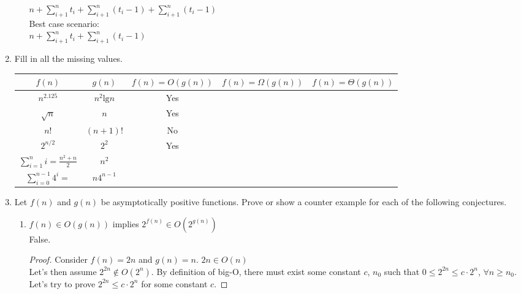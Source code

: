 \documentclass{article}
\begin{document}
\begin{enumerate}
\begin{enumerate}
                    $n + \sum_{i+1}^{n}t_i + \sum_{i+1}^{n}(t_i-1) + \sum_{i+1}^{n}(t_i-1)$\\
                    Best case scenario:\\
                    $n + \sum_{i+1}^{n}t_i + \sum_{i+1}^{n}(t_i-1)$
                \end{enumerate}
            \item Fill in all the missing values.
                \begin{center}
                    \begin{tabular}{|c | c | c | c | c|}
                        \hline
                        $f(n)$ & $g(n)$ & $f(n)=O(g(n))$ & $f(n)=\Omega(g(n))$ & $f(n)=\Theta(g(n))$\\
                        \hline
                        \hline
                        $n^{2.125}$ & $n^2\text{lg}n$ & Yes\\
                        \hline
                        $\sqrt{n}$ & $n$ & Yes\\
                        \hline
                        $n!$ & $(n+1)!$ & No\\
                        \hline
                        $2^{n/2}$ & $2^2$ & Yes\\
                        \hline
                        $\sum_{i=1}^{n}i= \frac{n^2+n}{2}$ & $n^2$\\
                        \hline
                        $\sum_{i=0}^{n-1}4^i=$ & $n4^{n-1}$\\
                        \hline
                    \end{tabular}
                \end{center}
            \item Let $f(n)$ and $g(n)$ be asymptotically positive functions. Prove or show a counter example for each of the following conjectures.
                \begin{enumerate}
                    \item $f(n)\in O(g(n))$ implies $2^{f(n)}\in O(2^{g(n)})$\\
                        False.
                        \begin{proof}
                            Consider $f(n) = 2n$ and $g(n) = n$.
                            $2n \in O(n)$\\
                            Let's then assume $2^{2n}\not\in O(2^{n})$. By definition of big-O, there must exist some constant $c$, $n_0$
                             such that $0\leq 2^{2n}\leq c\cdot 2^n$, $\forall n\geq n_0$. Let's try to prove $2^{2n}\leq c\cdot 2^n$ for some constant $c$.

\end{proof}
\end{enumerate}
\end{enumerate}
\end{document}
